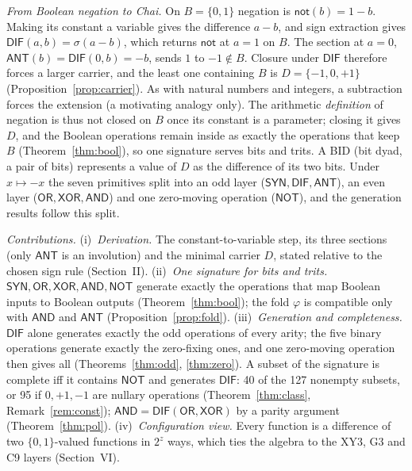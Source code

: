 \documentclass[conference]{IEEEtran}
\newcommand{\D}{D}
\newcommand{\sgn}{\sigma}
\newcommand{\fold}{\varphi}
\newcommand{\SYN}{\mathsf{SYN}}
\newcommand{\DIF}{\mathsf{DIF}}
\newcommand{\OR}{\mathsf{OR}}
\newcommand{\XOR}{\mathsf{XOR}}
\newcommand{\AND}{\mathsf{AND}}
\newcommand{\NOT}{\mathsf{NOT}}
\newcommand{\ANT}{\mathsf{ANT}}
\theoremstyle{remark}
\begin{document}
	\emph{From Boolean negation to Chai.} On $B=\{0,1\}$ negation is $\mathsf{not}(b)=1-b$. Making its constant a variable gives the difference $a-b$, and sign extraction gives $\DIF(a,b)=\sgn(a-b)$, which returns $\mathsf{not}$ at $a=1$ on $B$. The section at $a=0$, $\ANT(b)=\DIF(0,b)=-b$, sends $1$ to $-1\notin B$. Closure under $\DIF$ therefore forces a larger carrier, and the least one containing $B$ is $\D=\{-1,0,+1\}$ (Proposition~\ref{prop:carrier}). As with natural numbers and integers, a subtraction forces the extension (a motivating analogy only). The arithmetic \emph{definition} of negation is thus not closed on $B$ once its constant is a parameter; closing it gives $\D$, and the Boolean operations remain inside as exactly the operations that keep $B$ (Theorem~\ref{thm:bool}), so one signature serves bits and trits. A BID (bit dyad, a pair of bits) represents a value of $\D$ as the difference of its two bits. Under $x\mapsto-x$ the seven primitives split into an odd layer ($\SYN,\DIF,\ANT$), an even layer ($\OR,\XOR,\AND$) and one zero-moving operation ($\NOT$), and the generation results follow this split.
	
	\emph{Contributions.} (i)~\emph{Derivation.} The constant-to-variable step, its three sections (only $\ANT$ is an involution) and the minimal carrier $\D$, stated relative to the chosen sign rule (Section~II). (ii)~\emph{One signature for bits and trits.} $\SYN,\OR,\XOR,\AND,\NOT$ generate exactly the operations that map Boolean inputs to Boolean outputs (Theorem~\ref{thm:bool}); the fold $\fold$ is compatible only with $\AND$ and $\ANT$ (Proposition~\ref{prop:fold}). (iii)~\emph{Generation and completeness.} $\DIF$ alone generates exactly the odd operations of every arity; the five binary operations generate exactly the zero-fixing ones, and one zero-moving operation then gives all (Theorems~\ref{thm:odd}, \ref{thm:zero}). A subset of the signature is complete iff it contains $\NOT$ and generates $\DIF$: 40 of the 127 nonempty subsets, or 95 if $0,+1,-1$ are nullary operations (Theorem~\ref{thm:class}, Remark~\ref{rem:const}); $\AND=\DIF(\OR,\XOR)$ by a parity argument (Theorem~\ref{thm:pol}). (iv)~\emph{Configuration view.} Every function is a difference of two $\{0,1\}$-valued functions in $2^z$ ways, which ties the algebra to the XY3, G3 and C9 layers (Section~VI).
	
\end{document}
